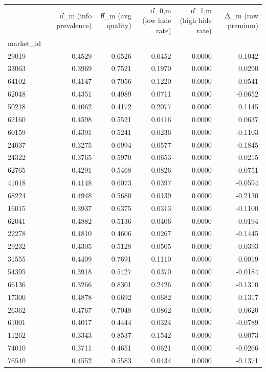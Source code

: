 \begin{tabular}{lrrrrr}
\toprule
 & π̂_m  (info prevalence) & θ̂_m  (avg quality) & σ̂_{0,m} (low hide rate) & σ̂_{1,m} (high hide rate) & Δ̄_m (raw premium) \\
market_id &  &  &  &  &  \\
\midrule
29019 & 0.4529 & 0.6526 & 0.0452 & 0.0000 & 0.1042 \\
33063 & 0.3969 & 0.7521 & 0.1970 & 0.0000 & 0.0290 \\
64102 & 0.4147 & 0.7056 & 0.1220 & 0.0000 & 0.0541 \\
62048 & 0.4351 & 0.4989 & 0.0711 & 0.0000 & -0.0652 \\
50218 & 0.4062 & 0.4172 & 0.2077 & 0.0000 & 0.1145 \\
62160 & 0.4598 & 0.5521 & 0.0416 & 0.0000 & 0.0637 \\
60159 & 0.4391 & 0.5241 & 0.0236 & 0.0000 & -0.1103 \\
24037 & 0.3275 & 0.6994 & 0.0577 & 0.0000 & -0.1845 \\
24322 & 0.3765 & 0.5970 & 0.0653 & 0.0000 & 0.0215 \\
62765 & 0.4291 & 0.5468 & 0.0826 & 0.0000 & -0.0751 \\
41018 & 0.4148 & 0.6073 & 0.0397 & 0.0000 & -0.0594 \\
68224 & 0.4948 & 0.5680 & 0.0139 & 0.0000 & -0.2130 \\
16015 & 0.3937 & 0.6375 & 0.0313 & 0.0000 & -0.1100 \\
62041 & 0.4882 & 0.5136 & 0.0406 & 0.0000 & -0.0194 \\
22278 & 0.4810 & 0.4606 & 0.0267 & 0.0000 & -0.1445 \\
29232 & 0.4305 & 0.5128 & 0.0505 & 0.0000 & -0.0393 \\
31555 & 0.4409 & 0.7691 & 0.1110 & 0.0000 & 0.0019 \\
54395 & 0.3918 & 0.5427 & 0.0370 & 0.0000 & -0.0184 \\
66136 & 0.3266 & 0.8301 & 0.2426 & 0.0000 & -0.1310 \\
17300 & 0.4878 & 0.6692 & 0.0682 & 0.0000 & 0.1317 \\
26362 & 0.4767 & 0.7048 & 0.0862 & 0.0000 & 0.0620 \\
61001 & 0.4017 & 0.4444 & 0.0324 & 0.0000 & -0.0789 \\
11262 & 0.3343 & 0.8537 & 0.1542 & 0.0000 & 0.0073 \\
74010 & 0.3711 & 0.4651 & 0.0621 & 0.0000 & -0.0266 \\
76540 & 0.4552 & 0.5583 & 0.0434 & 0.0000 & -0.1371 \\

\end{tabular}
